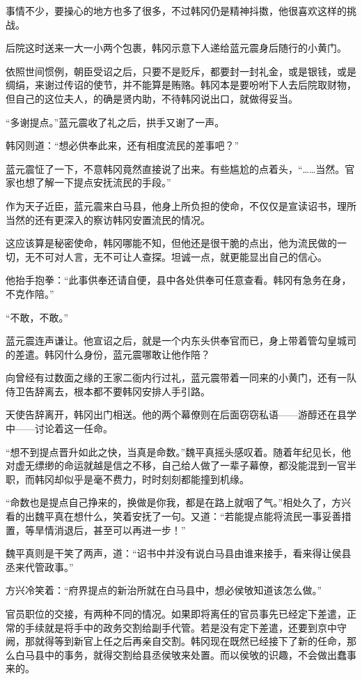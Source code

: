 事情不少，要操心的地方也多了很多，不过韩冈仍是精神抖擞，他很喜欢这样的挑战。

后院这时送来一大一小两个包裹，韩冈示意下人递给蓝元震身后随行的小黄门。

依照世间惯例，朝臣受诏之后，只要不是贬斥，都要封一封礼金，或是银钱，或是绸绢，来谢过传诏的使节，并不能算是贿赂。韩冈本是要吩咐下人去后院取财物，但自己的这位夫人，的确是贤内助，不待韩冈说出口，就做得妥当。

“多谢提点。”蓝元震收了礼之后，拱手又谢了一声。

韩冈则道：“想必供奉此来，还有相度流民的差事吧？”

蓝元震怔了一下，不意韩冈竟然直接说了出来。有些尴尬的点着头，“……当然。官家也想了解一下提点安抚流民的手段。”

作为天子近臣，蓝元震来白马县，他身上所负担的使命，不仅仅是宣读诏书，理所当然的还有更深入的察访韩冈安置流民的情况。

这应该算是秘密使命，韩冈哪能不知，但他还是很干脆的点出，他为流民做的一切，无不可对人言，无不可让人查探。坦诚一点，就更能显出自己的信心。

他抬手抱拳：“此事供奉还请自便，县中各处供奉可任意查看。韩冈有急务在身，不克作陪。”

“不敢，不敢。”

蓝元震连声谦让。他宣诏之后，就是一个内东头供奉官而已，身上带着管勾皇城司的差遣。韩冈什么身份，蓝元震哪敢让他作陪？

向曾经有过数面之缘的王家二衙内行过礼，蓝元震带着一同来的小黄门，还有一队侍卫告辞离去，根本都不要韩冈安排人手引路。

天使告辞离开，韩冈出门相送。他的两个幕僚则在后面窃窃私语——游醇还在县学中——讨论着这一任命。

“想不到提点晋升如此之快，当真是命数。”魏平真摇头感叹着。随着年纪见长，他对虚无缥缈的命运就越是信之不移，自己给人做了一辈子幕僚，都没能混到一官半职，而韩冈却似乎是毫不费力，时时刻刻都能撞到机缘。

“命数也是提点自己挣来的，换做是你我，都是在路上就咽了气。”相处久了，方兴看的出魏平真在想什么，笑着安抚了一句。又道：“若能提点能将流民一事妥善措置，等旱情消退后，甚至可以再进一步！”

魏平真则是干笑了两声，道：“诏书中并没有说白马县由谁来接手，看来得让侯县丞来代管政事。”

方兴冷笑着：“府界提点的新治所就在白马县中，想必侯敂知道该怎么做。”

官员职位的交接，有两种不同的情况。如果即将离任的官员事先已经定下差遣，正常的手续就是将手中的政务交割给副手代管。若是没有定下差遣，还要到京中守阙，那就得等到新官上任之后再亲自交割。韩冈现在既然已经接下了新的任命，那么白马县中的事务，就得交割给县丞侯敂来处置。而以侯敂的识趣，不会做出蠢事来的。

